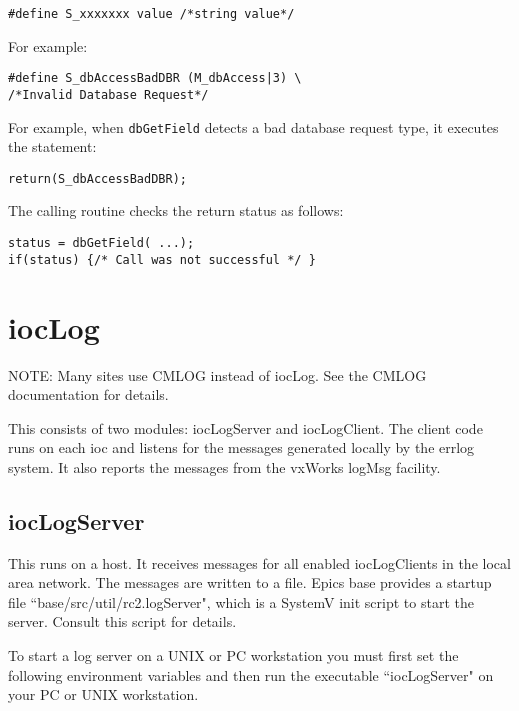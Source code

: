 \begin{verbatim}#define S_xxxxxxx value /*string value*/
\end{verbatim}For example:

\begin{verbatim}#define S_dbAccessBadDBR (M_dbAccess|3) \
/*Invalid Database Request*/
\end{verbatim}For example, when \verb|dbGetField| detects a bad database request type, it executes the statement:

\begin{verbatim}return(S_dbAccessBadDBR);
\end{verbatim}The calling routine checks the return status as follows:

\begin{verbatim}status = dbGetField( ...);
if(status) {/* Call was not successful */ }
\end{verbatim}\section{iocLog}

NOTE: Many sites use CMLOG instead of iocLog. See the CMLOG documentation for details.

This consists of two modules: iocLogServer and iocLogClient. The client code runs on each ioc and listens for the 
messages generated locally by the errlog system. It also reports the messages from the vxWorks logMsg facility.

\subsection{iocLogServer}

This runs on a host. It receives messages for all enabled iocLogClients in the local area network. The messages are written 
to a file. Epics base provides a startup file ``base/src/util/rc2.logServer", which is a SystemV init script to start the server. 
Consult this script for details.

To start a log server on a UNIX or PC workstation you must first set the following environment variables and then run the 
executable ``iocLogServer" on your PC or UNIX workstation. 

